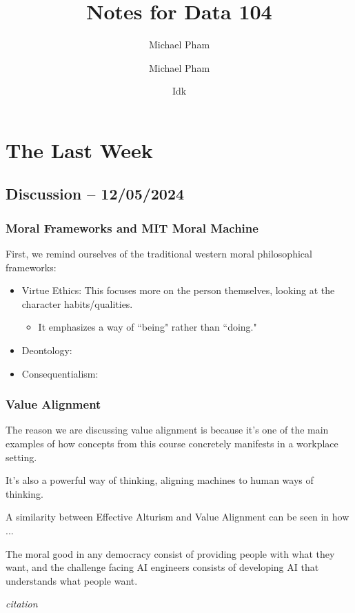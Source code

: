 \documentclass[openany]{book}
\title{#1}
\author{Michael Pham}
\date{#2}
\renewcommand{\mytitle}[2]{%
	\title{#1}
	\author{Michael Pham}
	\date{#2}
	\maketitle
	\newpage
	\mytoc
	\newpage
}
\begin{document}
\mytitle{Notes for Data 104}{Idk}

\chapter{The Last Week}
\section{Discussion -- 12/05/2024}
\subsection{Moral Frameworks and MIT Moral Machine}
First, we remind ourselves of the traditional western moral philosophical frameworks:
\begin{itemize}
	\item Virtue Ethics: This focuses more on the person themselves, looking at the character habits/qualities.
	\begin{itemize}
		\item It emphasizes a way of ``being" rather than ``doing."
	\end{itemize}
	\item Deontology: 
	\item Consequentialism:
\end{itemize}

\subsection{Value Alignment}
The reason we are discussing value alignment is because it's one of the main examples of how concepts from this course concretely manifests in a workplace setting.

It's also a powerful way of thinking, aligning machines to human ways of thinking.

A similarity between Effective Alturism and Value Alignment can be seen in how ...

\begin{fancyquotes}
	The moral good in any democracy consist of providing people with what they want, and the challenge facing AI engineers consists of developing AI that understands what people want.
	
	\begin{flushright}
		\emph{citation}
	\end{flushright}
\end{fancyquotes}
\end{document}
